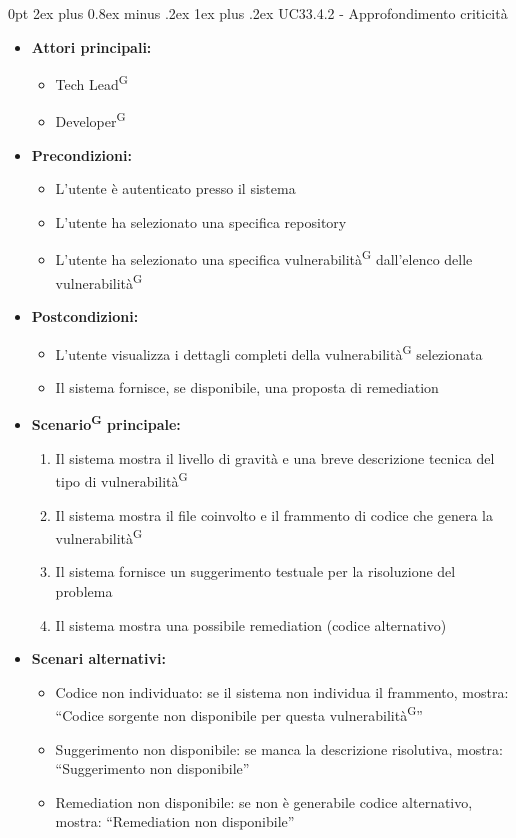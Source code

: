 \documentclass[a4paper, 11pt]{article}
\makeatletter
\renewcommand\subparagraph{\@startsection{subparagraph}{5}
  {0pt}
  {2ex plus 0.8ex minus .2ex}
  {1ex plus .2ex}
  {\normalfont\normalsize\bfseries\color{AccentColor}}}
\makeatother
\begin{document}
\subparagraph{UC33.4.2 - Approfondimento criticità}\label{UC33.4.2}
\begin{itemize}
    \item \textbf{Attori principali:}
    \begin{itemize}
        \item Tech Lead\textsuperscript{G}
        \item Developer\textsuperscript{G}
    \end{itemize}
    \item \textbf{Precondizioni:}
    \begin{itemize}
        \item L'utente è autenticato presso il sistema
        \item L’utente ha selezionato una specifica repository
        \item L'utente ha selezionato una specifica vulnerabilità\textsuperscript{G} dall'elenco delle vulnerabilità\textsuperscript{G}
    \end{itemize}
    \item \textbf{Postcondizioni:}
    \begin{itemize}
        \item L’utente visualizza i dettagli completi della vulnerabilità\textsuperscript{G} selezionata
        \item Il sistema fornisce, se disponibile, una proposta di remediation
    \end{itemize}
    \item \textbf{Scenario\textsuperscript{G} principale:}
    \begin{enumerate}
        \item Il sistema mostra il livello di gravità e una breve descrizione tecnica del tipo di vulnerabilità\textsuperscript{G}
        \item Il sistema mostra il file coinvolto e il frammento di codice che genera la vulnerabilità\textsuperscript{G}
        \item Il sistema fornisce un suggerimento testuale per la risoluzione del problema
        \item Il sistema mostra una possibile remediation (codice alternativo)
    \end{enumerate}
    \item \textbf{Scenari alternativi:}
    \begin{itemize}
        \item Codice non individuato: se il sistema non individua il frammento, mostra: ``Codice sorgente non disponibile per questa vulnerabilità\textsuperscript{G}''
        \item Suggerimento non disponibile: se manca la descrizione risolutiva, mostra: ``Suggerimento non disponibile''
        \item Remediation non disponibile: se non è generabile codice alternativo, mostra: ``Remediation non disponibile''
    \end{itemize}
\end{itemize}
\end{document}
